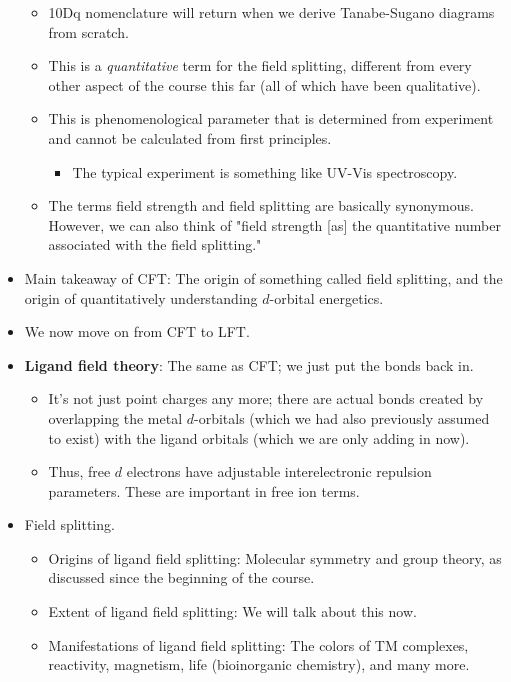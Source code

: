\documentclass[../notes.tex]{subfiles}
\begin{document}
\begin{itemize}
    \begin{itemize}
        \item 10Dq nomenclature will return when we derive Tanabe-Sugano diagrams from scratch.
        \item This is a \emph{quantitative} term for the field splitting, different from every other aspect of the course this far (all of which have been qualitative).
        \item This is phenomenological parameter that is determined from experiment and cannot be calculated from first principles.
        \begin{itemize}
            \item The typical experiment is something like UV-Vis spectroscopy.
        \end{itemize}
        \item The terms field strength and field splitting are basically synonymous. However, we can also think of "field strength [as] the quantitative number associated with the field splitting."
    \end{itemize}
    \item Main takeaway of CFT: The origin of something called field splitting, and the origin of quantitatively understanding $d$-orbital energetics.
    \item We now move on from CFT to LFT.
    \item \textbf{Ligand field theory}: The same as CFT; we just put the bonds back in.
    \begin{itemize}
        \item It's not just point charges any more; there are actual bonds created by overlapping the metal $d$-orbitals (which we had also previously assumed to exist) with the ligand orbitals (which we are only adding in now).
        \item Thus, free $d$ electrons have adjustable interelectronic repulsion parameters. These are important in free ion terms.
    \end{itemize}
    \item Field splitting.
    \begin{itemize}
        \item Origins of ligand field splitting: Molecular symmetry and group theory, as discussed since the beginning of the course.
        \item Extent of ligand field splitting: We will talk about this now.
        \item Manifestations of ligand field splitting: The colors of TM complexes, reactivity, magnetism, life (bioinorganic chemistry), and many more.

\end{itemize}
\end{itemize}
\end{document}
